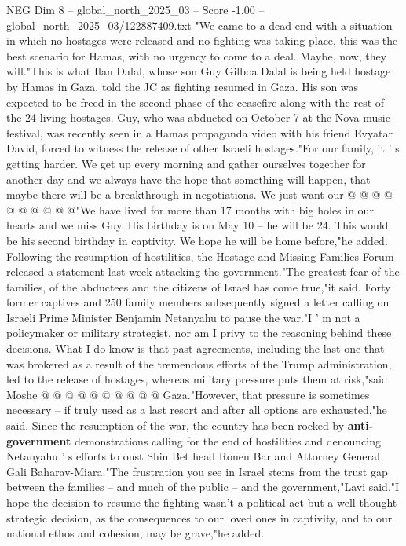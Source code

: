 \begin{textsample}{NEG Dim 8 – global\_north\_2025\_03 – Score -1.00 – global\_north\_2025\_03/122887409.txt}  \label{ex:f8_neg_361}
"We came to a dead end with a situation in which no hostages were released and no fighting was taking place, this was the best scenario for Hamas, with no urgency to come to a deal.
Maybe, now, they will."This is what Ilan Dalal, whose son Guy Gilboa Dalal is being held hostage by Hamas in Gaza, told the JC as fighting resumed in Gaza.
His son was expected to be freed in the second phase of the ceasefire along with the rest of the 24 living hostages.
Guy, who was abducted on October 7 at the Nova music festival, was recently seen in a Hamas propaganda video with his friend Evyatar David, forced to witness the release of other Israeli hostages."For our family, it ' s getting harder.
We get up every morning and gather ourselves together for another day and we always have the hope that something will happen, that maybe there will be a breakthrough in negotiations.
We just want our @ @ @ @ @ @ @ @ @ @"We have lived for more than 17 months with big holes in our hearts and we miss Guy.
His birthday is on May 10 -- he will be 24.
This would be his second birthday in captivity.
We hope he will be home before,"he added.
Following the resumption of hostilities, the Hostage and Missing Families Forum released a statement last week attacking the government."The greatest fear of the families, of the abductees and the citizens of Israel has come true,"it said.
Forty former captives and 250 family members subsequently signed a letter calling on Israeli Prime Minister Benjamin Netanyahu to pause the war."I ' m not a policymaker or military strategist, nor am I privy to the reasoning behind these decisions.
What I do know is that past agreements, including the last one that was brokered as a result of the tremendous efforts of the Trump administration, led to the release of hostages, whereas military pressure puts them at risk,"said Moshe @ @ @ @ @ @ @ @ @ @ Gaza."However, that pressure is sometimes necessary -- if truly used as a last resort and after all options are exhausted,"he said.
Since the resumption of the war, the country has been rocked by \textbf{anti-government} demonstrations calling for the end of hostilities and denouncing Netanyahu ' s efforts to oust Shin Bet head Ronen Bar and Attorney General Gali Baharav-Miara."The frustration you see in Israel stems from the trust gap between the families -- and much of the public -- and the government,"Lavi said."I hope the decision to resume the fighting wasn't a political act but a well-thought strategic decision, as the consequences to our loved ones in captivity, and to our national ethos and cohesion, may be grave,"he added.

\end{textsample}
